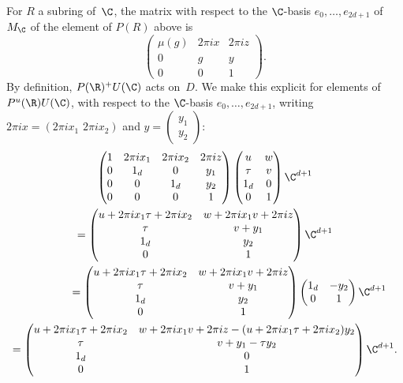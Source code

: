 For $R$ a subring of~$\C$, the matrix with respect to the $\C$-basis
$e_0,\ldots,e_{2d+1}$ of $M_\C$ of the element of $P(R)$ above is
\begin{equation}
\label{eq:P_element}
\begin{pmatrix}
\mu(g) & 2\pi i x & 2\pi iz\\
0 & g & y\\
0 & 0 & 1
\end{pmatrix}.
\end{equation}
By definition, $P(\R)^+U(\C)$ acts on~$D$. We make this explicit for
elements of $P^u(\R)U(\C)$, with respect to the $\C$-basis
$e_0,\ldots,e_{2d+1}$, writing $2\pi ix= (2\pi ix_1\,\, 2\pi ix_2)$ and
$y=(\substack{y_1\\ y_2})$:
\begin{multline}\label{eq:P-action}
\begin{pmatrix}
1 & 2\pi ix_1 & 2\pi ix_2 & 2\pi iz\\
0 & 1_d & 0 & y_1\\
0 & 0 & 1_d & y_2\\
0 & 0 & 0 & 1
\end{pmatrix}
\begin{pmatrix}
u & w\\ \tau & v \\ 1_d & 0\\ 0 & 1
\end{pmatrix}
\C^{d+1} \\ =
\begin{pmatrix}
u+2\pi ix_1\tau + 2\pi ix_2& w+2\pi ix_1v+2\pi iz\\
\tau & v + y_1\\ 1_d & y_2\\ 0 & 1
\end{pmatrix}
\C^{d+1} \\ \shoveright{=
\begin{pmatrix}
u+2\pi ix_1\tau + 2\pi ix_2& w+2\pi ix_1v+2\pi iz\\
\tau & v + y_1\\ 1_d & y_2\\ 0 & 1
\end{pmatrix}
\begin{pmatrix}
1_d & -y_2\\ 0 & 1
\end{pmatrix}
\C^{d+1}} \\ =
\begin{pmatrix}
u+2\pi ix_1\tau + 2\pi ix_2& w+2\pi ix_1v+2\pi iz-(u+2\pi ix_1\tau + 2\pi ix_2)y_2\\
\tau & v + y_1 -\tau y_2\\
1_d & 0
\\ 0 & 1
\end{pmatrix}
\C^{d+1}.
\end{multline}

